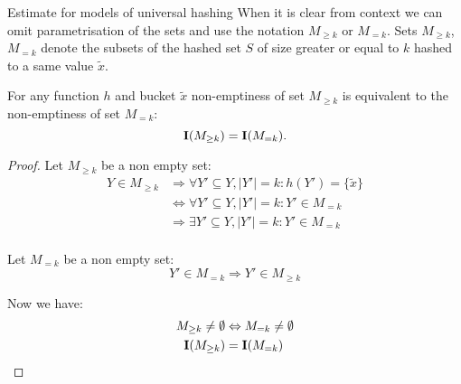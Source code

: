 \begin{section}{Estimate for models of universal hashing}
When it is clear from context we can omit parametrisation of the sets and use the notation $M_{\geq k}$ or $M_{= k}$. Sets $M_{\geq k}$, $M_{= k}$ denote the subsets of the hashed set $S$ of size greater or equal to $k$ hashed to a same value $\tilde{x}$. 

\begin{lemma}
\label{lemma-indicator-k-collision}
For any function $h$ and bucket $\tilde{x}$ non-emptiness of set $M_{\geq k}$ is equivalent to the non-emptiness of set $M_{= k}$:
\begin{displaymath}
\mathbf{I}(M_{\geq k}) = \mathbf{I}(M_{= k}) \text{.}
\end{displaymath}
\begin{proof}
Let $M_{\geq k}$ be a non empty set:
\begin{displaymath}
\begin{split}
Y \in M_{\geq k} 
	& \Rightarrow \forall Y' \subseteq Y, |Y'| = k: h(Y') = \{\tilde{x}\} \\
	& \Leftrightarrow \forall Y' \subseteq Y, |Y'| = k: Y' \in M_{=k} \\
	& \Rightarrow \exists Y' \subseteq Y, |Y'| = k: Y' \in M_{=k} \\
\end{split}
\end{displaymath}

Let $M_{=k}$ be a non empty set:
\begin{displaymath}
Y' \in M_{=k} \Rightarrow Y' \in M_{\geq k}
\end{displaymath}

Now we have:
\begin{displaymath}
\begin{split}
M_{\geq k} \neq \emptyset & \Leftrightarrow  M_{= k} \neq \emptyset \\
\mathbf{I}(M_{\geq k}) & = \mathbf{I}(M_{= k})
\end{split}
\end{displaymath}
\end{proof}
\end{lemma}


\end{section}
